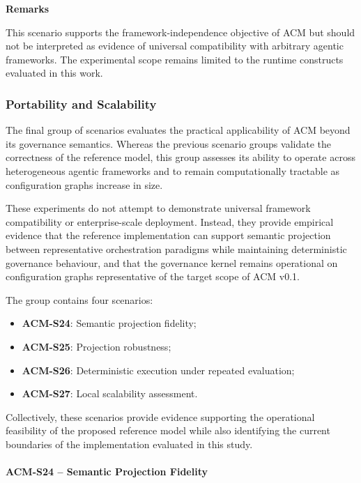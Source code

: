 \documentclass[10pt]{article}
\begin{document}
\textbf{Remarks}

This scenario supports the framework-independence objective of ACM but should
not be interpreted as evidence of universal compatibility with arbitrary
agentic frameworks. The experimental scope remains limited to the runtime
constructs evaluated in this work.

\subsubsection{Portability and Scalability}
\label{app:scenario_group_e}

The final group of scenarios evaluates the practical applicability of ACM
beyond its governance semantics. Whereas the previous scenario groups validate
the correctness of the reference model, this group assesses its ability to
operate across heterogeneous agentic frameworks and to remain computationally
tractable as configuration graphs increase in size.

These experiments do not attempt to demonstrate universal framework
compatibility or enterprise-scale deployment. Instead, they provide empirical
evidence that the reference implementation can support semantic projection
between representative orchestration paradigms while maintaining deterministic
governance behaviour, and that the governance kernel remains operational on
configuration graphs representative of the target scope of ACM v0.1.

The group contains four scenarios:

\begin{itemize}
    \item \textbf{ACM-S24}: Semantic projection fidelity;
    \item \textbf{ACM-S25}: Projection robustness;
    \item \textbf{ACM-S26}: Deterministic execution under repeated evaluation;
    \item \textbf{ACM-S27}: Local scalability assessment.
\end{itemize}

Collectively, these scenarios provide evidence supporting the operational
feasibility of the proposed reference model while also identifying the current
boundaries of the implementation evaluated in this study.

\paragraph{ACM-S24 -- Semantic Projection Fidelity}
\end{document}
